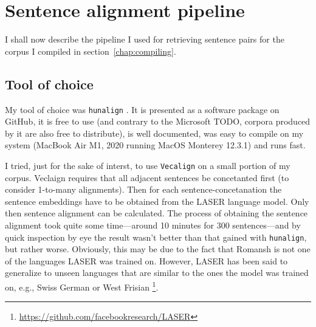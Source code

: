 \section{Sentence alignment pipeline}

\begin{figure}[h]
\centering
{}
\end{figure}

I shall now describe the pipeline I used for retrieving sentence pairs for the corpus I compiled in section~\ref{chap:compiling}.

\subsection{Tool of choice}
\label{subsec:tool}
My tool of choice was \texttt{hunalign} \autocite{hunalign}. 
It is presented as a software package on GitHub, it is free to use (and contrary to the Microsoft TODO, corpora produced by it are also free to distribute), is well documented, was easy to compile on my system (MacBook Air M1, 2020 running MacOS Monterey 12.3.1) and runs fast. 

I tried, just for the sake of interst, to use \texttt{Vecalign} on a small portion of my corpus. 
Veclaign requires that all adjacent sentences be concetanted first (to consider 1-to-many alignments). 
Then for each sentence-concetanation the sentence embeddings have to be obtained from the LASER language model. 
Only then sentence alignment can be calculated. 
The process of obtaining the sentence alignment took quite some time---around 10 minutes for 300 sentences---and by quick inspection by eye the result wasn't better than that gained with \texttt{hunalign}, but rather worse. 
Obviously, this may be due to the fact that Romansh is not one of the languages LASER was trained on. 
However, LASER has been said to generalize to unseen languages that are similar to the ones the model was trained on, e.g., Swiss German or West Frisian \footnote{\url{https://github.com/facebookresearch/LASER}}.

